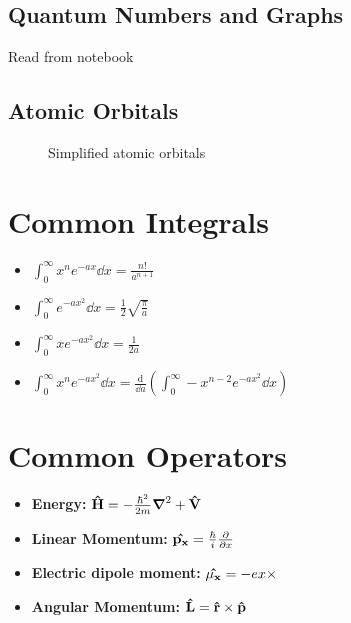 \documentclass[11pt]{article}
\theoremstyle{definition}
\begin{document}
\subsection{Quantum Numbers and Graphs}
Read from notebook

\subsection{Atomic Orbitals}
\begin{figure}[htbp]
  \centering
  
  \caption{Simplified atomic orbitals}
\end{figure}

\section{Common Integrals}
\begin{itemize}
    \item $\int_0 ^{\infty} x^n e^{-a x} \dd{x}=\frac{n!}{a^{n+1}} $
    \item $\int_0^{\infty} e^{-ax^2} \dd{x} = \frac{1}{2} \sqrt{\frac{\pi}{a}} $
    \item $\int_0^{\infty} xe^{-ax^2} \dd{x} = \frac{1}{2a}$
    \item $\int_0^{\infty} x^n e^{-ax^2} \dd{x} = \frac{\text{d}}{\dd{a}} \left(\int_0^{\infty} -x^{n-2} e^{-ax^2} \dd{x}\right)$
\end{itemize}

\section{Common Operators}
\begin{itemize}
    \item \textbf{Energy: } $\vectorunit{H} = -\frac{\hbar^2}{2m} \grad^2 + \vectorunit{V}$
    \item \textbf{Linear Momentum: } $\vectorunit{p_x} = \frac{\hbar}{i} \frac{\partial}{\partial x}$
    \item \textbf{Electric dipole moment:} $\vectorunit{\mu_x} = -ex \times$
    \item \textbf{Angular Momentum: } $\vectorunit{L} = \vectorunit{r} \times \vectorunit{p}$
\end{itemize}
\end{document}
